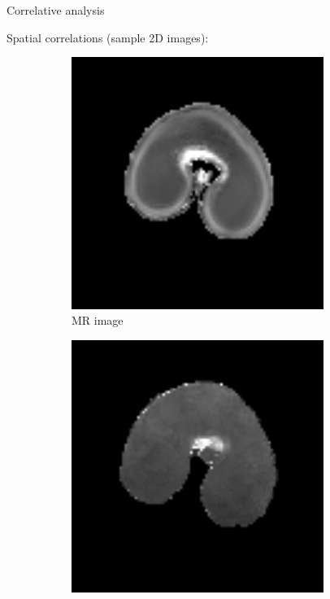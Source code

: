 \documentclass[10pt]{beamer}
\begin{document}
\begin{frame}{Correlative analysis}

  Spatial correlations (sample 2D images):

    \begin{figure}[ht]
    \centering
    \begin{subfigure}[t]{0.33\textwidth}
      \centering
      \includegraphics[width=0.9\textwidth]{fig/mri_slice8_250_2}
      \caption{MR image}
      \label{subfig:mri_slice8_250}
    \end{subfigure}%
    \begin{subfigure}[t]{0.33\textwidth}
      \centering
      \includegraphics[width=0.9\textwidth]{fig/t2_sic_n10_rapports_8_13.png}

\end{subfigure}
\end{figure}
\end{frame}
\end{document}
